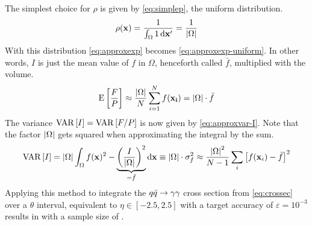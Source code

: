 The simplest choice for \(\rho\) is given
by \cref{eq:simplep}, the uniform distribution.
%
\begin{equation}
  \label{eq:simplep}
  \rho(\vb{x}) = \frac{1}{\int_{\Omega}1\dd{\vb{x'}}} =
  \frac{1}{\abs{\Omega}}
\end{equation}
%
With this distribution \cref{eq:approxexp} becomes
\cref{eq:approxexp-uniform}. In other words, \(I\) is just the mean
value of \(f\) in \(\Omega\), henceforth called \(\bar{f}\),
multiplied with the volume.
%
\begin{equation}
  \label{eq:approxexp-uniform}
  \operatorname{E}\qty[\frac{F}{P}] \approx
  \frac{\abs{\Omega}}{N}\sum_{i=1}^N f(\vb{x_i}) = \abs{\Omega}\cdot\bar{f}
\end{equation}
%
The variance \(\operatorname{VAR}\qty[I]=\operatorname{VAR}\qty[F/P]\) is now given
by \cref{eq:approxvar-I}. Note that the factor \(\abs{\Omega}\) gets
squared when approximating the integral by the sum.
%
\begin{equation}
  \label{eq:approxvar-I}
  \operatorname{VAR}\qty[I] = \abs{\Omega}\int_\Omega f(\vb{x})^2 -
  \underbrace{\qty(\frac{I}{\abs{\Omega}})^2}_{=\bar{f}} \dd{\vb{x}} \equiv \abs{\Omega}\cdot\sigma_f^2 \approx
  \frac{\abs{\Omega}^2}{N-1}\sum_{i}\qty[f(\vb{x}_i) - \bar{f}]^2
\end{equation}
%
Applying this method to integrate the \(q\bar{q}\rightarrow\gamma\gamma\) cross section from
\cref{eq:crossec} over a \(\theta\) interval, equivalent to
\(\eta\in [-2.5, 2.5]\) with a target accuracy of
\(\varepsilon=10^{-3}\) results in  with a
sample size of .

